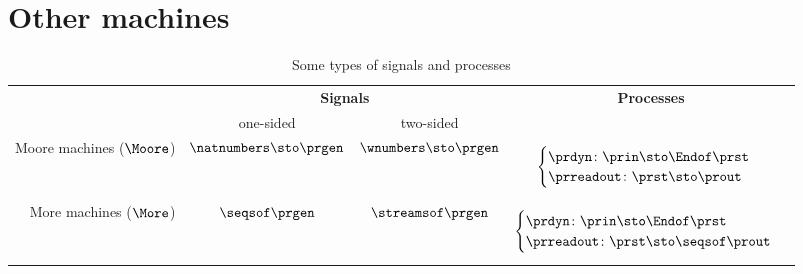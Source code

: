 \section{Other machines}

\begin{table*}[b]
	\caption{Some types of signals and processes}
	\label{tab:processes-types}
	\begin{tabular}{rccc}
		                                             & \multicolumn{2}{c}{\textbf{Signals}}      & \textbf{Processes}     \\
		                                             & \rule{0pt}{10pt} one-sided                & two-sided            & \\
		Moore machines ($\Moore$)                    &
		$\natnumbers \sto \prgen$
		                                             &
		$\wnumbers \sto \prgen$
		                                             &
		\begin{minipage}{4cm}
			\raggedright
			\begin{equation*}
				\begin{cases}
					\prdyn \colon \prin \sto \Endof \prst \\
					\prreadout \colon \prst \sto \prout
				\end{cases}
			\end{equation*}
		\end{minipage}                                                                                        \\

		More machines ($\More$)                      & $\seqsof \prgen$                          & $\streamsof \prgen$
		                                             &
		\begin{minipage}{4cm}
			\raggedright
			\begin{equation*}
				\begin{cases}
					\prdyn \colon   \prin \sto \Endof \prst \\
					\prreadout \colon \prst \sto \seqsof \prout
				\end{cases}
			\end{equation*}


\end{minipage}
\end{tabular}
\end{table*}
